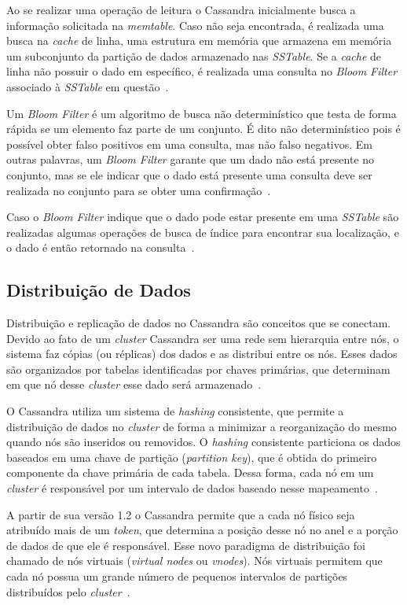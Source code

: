 Ao se realizar uma operação de leitura o Cassandra inicialmente busca a informação solicitada na \emph{memtable}. Caso não seja encontrada, é realizada uma busca na \emph{cache} de linha, uma estrutura em memória que armazena em memória um subconjunto da partição de dados armazenado nas \emph{SSTable}. Se a \emph{cache} de linha não possuir o dado em específico, é realizada uma consulta no \emph{Bloom Filter} associado à \emph{SSTable} em questão~\cite{cassandradocs}. 

Um \emph{Bloom Filter} é um algoritmo de busca não determinístico que testa de forma rápida se um elemento faz parte de um conjunto. É dito não determinístico pois é possível obter falso positivos em uma consulta, mas não falso negativos. Em outras palavras, um \emph{Bloom Filter} garante que um dado não está presente no conjunto, mas se ele indicar que o dado está presente uma consulta deve ser realizada no conjunto para se obter uma confirmação~\cite{cassandraguide}.

Caso o \emph{Bloom Filter} indique que o dado pode estar presente em uma \emph{SSTable} são realizadas algumas operações de busca de índice para encontrar sua localização, e o dado é então retornado na consulta~\cite{cassandradocs}.

\subsection{Distribuição de Dados}
Distribuição e replicação de dados no Cassandra são conceitos que se conectam. Devido ao fato de um \emph{cluster} Cassandra ser uma rede sem hierarquia entre nós, o sistema faz cópias (ou réplicas) dos dados e as distribui entre os nós. Esses dados são organizados por tabelas identificadas por chaves primárias, que determinam em que nó desse \emph{cluster} esse dado será armazenado~\cite{cassandradocs}.

O Cassandra utiliza um sistema de \emph{hashing} consistente, que permite a distribuição de dados no \emph{cluster} de forma a minimizar a reorganização do mesmo quando nós são inseridos ou removidos. O \emph{hashing} consistente particiona os dados baseados em uma chave de partição (\emph{partition key}), que é obtida do primeiro componente da chave primária de cada tabela. Dessa forma, cada nó em um \emph{cluster} é responsável por um intervalo de dados baseado nesse mapeamento~\cite{cassandradocs}.

A partir de sua versão 1.2 o Cassandra permite que a cada nó físico seja atribuído mais de um \emph{token}, que determina a posição desse nó no anel e a porção de dados de que ele é responsável. Esse novo paradigma de distribuição foi chamado de nós virtuais (\emph{virtual nodes} ou \emph{vnodes}).
Nós virtuais permitem que cada nó possua um grande número de pequenos intervalos de partições distribuídos pelo \emph{cluster}~\cite{cassandradocs}.

